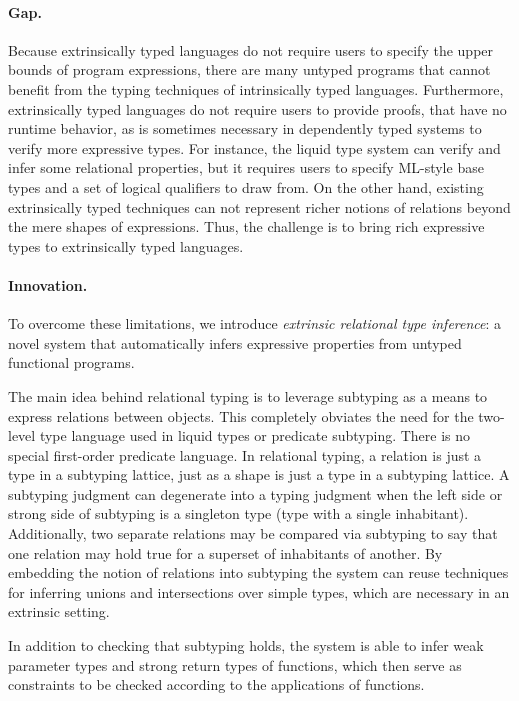 \documentclass[acmsmall]{acmart}
\theoremstyle{definition}
\begin{document}
\paragraph{Gap.} 
Because extrinsically typed languages do not require users to specify the upper bounds of program expressions,
there are many untyped programs that cannot benefit from the typing techniques of 
intrinsically typed languages. Furthermore, extrinsically typed languages do not require users to provide proofs,
that have no runtime behavior, as is sometimes necessary in dependently typed systems to verify more expressive types.   
For instance, the liquid type system \cite{} can verify and infer some relational properties, 
but it requires users to specify ML-style base types and a set of logical qualifiers to draw from.
On the other hand, existing extrinsically typed techniques can not represent richer notions of relations 
beyond the mere shapes of expressions.
Thus, the challenge is to bring rich expressive types to extrinsically typed languages.

\paragraph{Innovation.} 
To overcome these limitations, we introduce \textit{extrinsic relational type inference}: 
a novel system
that automatically infers expressive properties from untyped functional programs. 

The main idea behind relational typing is to leverage subtyping as a means to express relations
between objects. This completely obviates the need for the two-level type language
used in liquid types or predicate subtyping. There is no special first-order predicate language. 
In relational typing, a relation is just a type in a subtyping lattice, just as a shape is just  
a type in a subtyping lattice. A subtyping judgment can degenerate into a typing judgment
when the left side or strong side of subtyping is a singleton type (type with a single inhabitant).
Additionally, two separate relations may be compared via subtyping to say that one relation may hold true for a superset of inhabitants 
of another.
By embedding the notion of relations into subtyping the system can reuse techniques for inferring unions and
intersections over simple types, which are necessary in an extrinsic setting. 

In addition to checking that subtyping holds, the system is able to infer weak 
parameter types and strong return types of functions, which then serve as constraints
to be checked according to the applications of functions.
\end{document}
